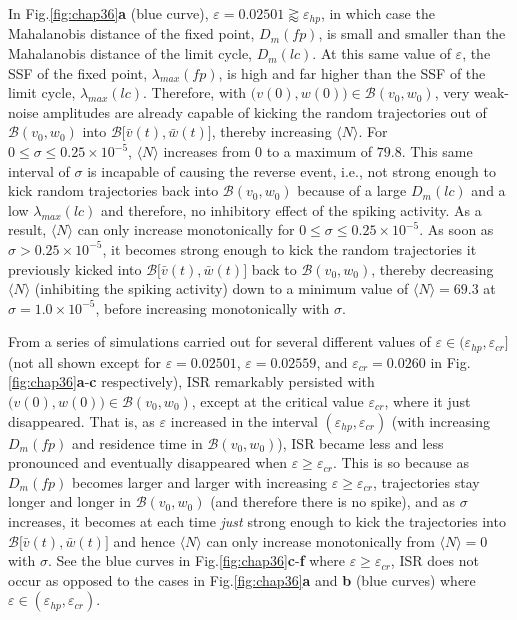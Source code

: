 In Fig.\ref{fig:chap36}\textbf{a} (blue curve),
$\varepsilon=0.02501\gtrapprox\varepsilon_{hp}$, in which case the
Mahalanobis distance of the fixed point, $D_m(fp)$, is small and
smaller than the Mahalanobis distance of the limit cycle,
$D_m(lc)$. At this same value of $\varepsilon$, the SSF of the fixed point, $\lambda_{max}(fp)$, is
high and far higher than the SSF of
the limit cycle, $\lambda_{max}(lc)$. Therefore, with
$\big(v(0),w(0)\big)\in\mathcal{B}(v_0,w_0)$, very weak-noise
amplitudes are already capable of kicking the random trajectories out of
$\mathcal{B}(v_0,w_0)$ into
$\mathcal{B}\big[\bar{v}(t),\bar{w}(t)\big]$, thereby increasing
$\langle N\rangle$. For $0\leq\sigma\leq0.25\times10^{-5}$, $\langle N\rangle$ increases
from $0$ to a maximum of $79.8$. This same interval of $\sigma$ is
incapable of causing the reverse event, i.e., not strong enough to
kick random trajectories back into $\mathcal{B}(v_0,w_0)$ because of a
large $D_m(lc)$ and a low $\lambda_{max}(lc)$ and therefore, no
inhibitory effect of the spiking activity. As a
result, $\langle N\rangle$ can only  increase monotonically for
$0\leq\sigma\leq0.25\times10^{-5}$.
As soon as $\sigma>0.25\times10^{-5}$, it becomes strong enough to
kick the random trajectories it previously kicked into
$\mathcal{B}\big[\bar{v}(t),\bar{w}(t)\big]$ back to
$\mathcal{B}(v_0,w_0)$, thereby decreasing $\langle N\rangle$ (inhibiting the
spiking activity) down to a minimum value of $\langle N\rangle=69.3$ at
$\sigma=1.0\times10^{-5}$, before increasing monotonically with
$\sigma$.

From a series of simulations carried out for several different values of 
$\varepsilon\in(\varepsilon_{hp},\varepsilon_{cr}]$ (not all shown except for 
$\varepsilon=0.02501$, $\varepsilon=0.02559$, and $\varepsilon_{cr}=0.0260$ 
in Fig.\ref{fig:chap36}\textbf{a}-\textbf{c} respectively),
ISR remarkably persisted with $\big(v(0),w(0)\big)\in\mathcal{B}(v_0,w_0)$,
except at the critical value
$\varepsilon_{cr}$, where it just disappeared. 
That is, as $\varepsilon$ increased in the interval $(\varepsilon_{hp},\varepsilon_{cr})$ 
(with increasing $D_{m}(fp)$ and residence
time in $\mathcal{B}(v_0,w_0)$), ISR became less and less pronounced and eventually 
disappeared when $\varepsilon\geq\varepsilon_{cr}$.
This is so because as $D_{m}(fp)$ becomes larger and larger with increasing
$\varepsilon\geq\varepsilon_{cr}$, trajectories stay longer and longer in
$\mathcal{B}(v_0,w_0)$ (and therefore there is no spike), and as $\sigma$
increases, it becomes at each time \emph{just} strong enough to
kick the trajectories into $\mathcal{B}\big[\bar{v}(t),\bar{w}(t)\big]$
and hence $\langle N\rangle$ can only increase monotonically 
from $\langle N\rangle=0$ with $\sigma$. See
the blue curves in Fig.\ref{fig:chap36}\textbf{c}-\textbf{f} 
where $\varepsilon\geq\varepsilon_{cr}$, ISR does not occur as opposed to
the cases in Fig.\ref{fig:chap36}\textbf{a} and \textbf{b} (blue curves) where 
$\varepsilon\in(\varepsilon_{hp},\varepsilon_{cr})$.

